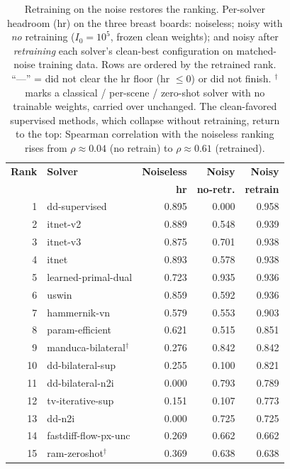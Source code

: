 \documentclass[AMA,twocolumn]{USG} %
\begin{document}
\begin{table}[t]
\caption{Retraining on the noise restores the ranking. Per-solver headroom (hr) on the three breast boards: noiseless; noisy with \emph{no} retraining ($I_0=10^5$, frozen clean weights); and noisy after \emph{retraining} each solver's clean-best configuration on matched-noise training data. Rows are ordered by the retrained rank. ``---'' = did not clear the hr floor (hr $\le0$) or did not finish. $^\dagger$ marks a classical / per-scene / zero-shot solver with no trainable weights, carried over unchanged. The clean-favored supervised methods, which collapse without retraining, return to the top: Spearman correlation with the noiseless ranking rises from $\rho\approx0.04$ (no retrain) to $\rho\approx0.61$ (retrained).\label{tab:retrain}}
\scriptsize
\setlength{\tabcolsep}{4pt}
\centering
\begin{tabular}{@{}rlrrr@{}}
\toprule
\textbf{Rank} & \textbf{Solver} & \textbf{Noiseless} & \textbf{Noisy} & \textbf{Noisy} \\
              &                 & \textbf{hr}        & \textbf{no-retr.} & \textbf{retrain} \\
\midrule
 1 & dd-supervised & 0.895 & 0.000 & 0.958 \\
 2 & itnet-v2 & 0.889 & 0.548 & 0.939 \\
 3 & itnet-v3 & 0.875 & 0.701 & 0.938 \\
 4 & itnet & 0.893 & 0.578 & 0.938 \\
 5 & learned-primal-dual & 0.723 & 0.935 & 0.936 \\
 6 & uswin & 0.859 & 0.592 & 0.936 \\
 7 & hammernik-vn & 0.579 & 0.553 & 0.903 \\
 8 & param-efficient & 0.621 & 0.515 & 0.851 \\
 9 & manduca-bilateral$^\dagger$ & 0.276 & 0.842 & 0.842 \\
10 & dd-bilateral-sup & 0.255 & 0.100 & 0.821 \\
11 & dd-bilateral-n2i & 0.000 & 0.793 & 0.789 \\
12 & tv-iterative-sup & 0.151 & 0.107 & 0.773 \\
13 & dd-n2i & 0.000 & 0.725 & 0.725 \\
14 & fastdiff-flow-px-unc & 0.269 & 0.662 & 0.662 \\
15 & ram-zeroshot$^\dagger$ & 0.369 & 0.638 & 0.638 \\

\end{tabular}
\end{table}
\end{document}
